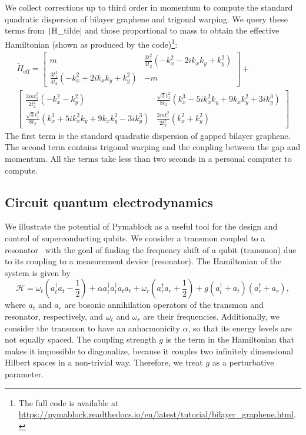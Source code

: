 We collect corrections up to third order in momentum to compute the standard
quadratic dispersion of bilayer graphene and trigonal warping.
We query these terms from \texttt|H_tilde| and those proportional
to mass to obtain the effective Hamiltonian (shown as produced by the
code)\footnote{The full code is available at
\url{https://pymablock.readthedocs.io/en/latest/tutorial/bilayer_graphene.html}.}:
%
{\small
\begin{gather}
\tilde{H}_{\textrm{eff}} =
\begin{bmatrix}
m & \frac{3 t_1^2}{4 t_2} ( - k_x^2 - 2ik_x k_y + k_y^2) \\
\frac{3 t_1^2}{4 t_2} ( - k_x^2 + 2ik_x k_y + k_y^2) & -m
\end{bmatrix} + \nonumber \\
\begin{bmatrix}
\frac{3 m t_1^2}{2 t_2^2} ( - k_x^2 - k_y^2) & \frac{\sqrt{3} t_1^2}{8 t_2} (k_x^3 - 5ik_x^2 k_y + 9 k_x k_y^2 + 3ik_y^3) \\
\frac{\sqrt{3} t_1^2}{8 t_2} (k_x^3 + 5ik_x^2 k_y + 9 k_x k_y^2 - 3ik_y^3) & \frac{3 m t_1^2}{2 t_2^2} (k_x^2 + k_y^2)
\end{bmatrix} \nonumber
\end{gather}
}
%
The first term is the standard quadratic dispersion of gapped bilayer
graphene.
The second term contains trigonal warping and the coupling between the gap and
momentum.
All the terms take less than two seconds in a personal computer to compute.

\subsection{Circuit quantum electrodynamics}

We illustrate the potential of Pymablock as a useful tool for the
design and control of superconducting qubits.
We consider a transmon coupled to a resonator~\cite{Krantz_2019} with the goal
of finding the frequency shift of a qubit (transmon) due to its coupling to a
measurement device (resonator).
The Hamiltonian of the system is given by
%
\begin{equation}
    \label{eq:H_cqed}
    \mathcal{H} =
    \omega_t (a^{\dagger}_{t} a_{t} - \frac{1}{2})
    + \alpha a^{\dagger}_{t} a^{\dagger}_{t} a_{t} a_{t} +
    \omega_r (a^{\dagger}_{r} a_{r} + \frac{1}{2}) +
    g (a^{\dagger}_{t} + a_{t}) (a^{\dagger}_{r} + a_{r}),
\end{equation}
%
where $a_t$ and $a_r$ are bosonic annihilation operators of the transmon
and resonator, respectively, and $\omega_t$ and $\omega_r$ are their
frequencies.
Additionally, we consider the transmon to have an anharmonicity $\alpha$,
so that its energy levels are not equally spaced.
The coupling strength $g$ is the term in the Hamiltonian that makes it
impossible to diagonalize, because it couples two infinitely dimensional
Hilbert spaces in a non-trivial way.
Therefore, we treat $g$ as a perturbative parameter.

